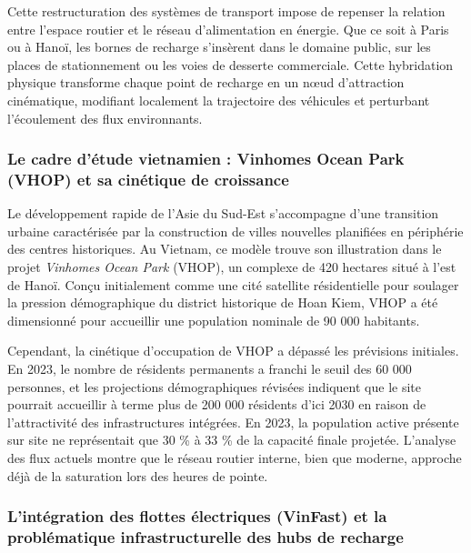\documentclass[10pt, a4paper]{article}
\begin{document}
Cette restructuration des systèmes de transport impose de repenser la
relation entre l'espace routier et le réseau d'alimentation en énergie.
Que ce soit à Paris ou à Hanoï, les bornes de recharge s'insèrent dans
le domaine public, sur les places de stationnement ou les voies de
desserte commerciale. Cette hybridation physique transforme chaque point
de recharge en un nœud d'attraction cinématique, modifiant localement la
trajectoire des véhicules et perturbant l'écoulement des flux
environnants.

\subsubsection{Le cadre d'étude vietnamien : Vinhomes Ocean Park (VHOP)
et sa cinétique de
croissance}\label{le-cadre-duxe9tude-vietnamien-vinhomes-ocean-park-vhop-et-sa-cinuxe9tique-de-croissance}

Le développement rapide de l'Asie du Sud-Est s'accompagne d'une
transition urbaine caractérisée par la construction de villes nouvelles
planifiées en périphérie des centres historiques. Au Vietnam, ce modèle
trouve son illustration dans le projet \emph{Vinhomes Ocean Park}
(VHOP), un complexe de 420 hectares situé à l'est de Hanoï. Conçu
initialement comme une cité satellite résidentielle pour soulager la
pression démographique du district historique de Hoan Kiem, VHOP a été
dimensionné pour accueillir une population nominale de 90 000 habitants.

Cependant, la cinétique d'occupation de VHOP a dépassé les prévisions
initiales. En 2023, le nombre de résidents permanents a franchi le seuil
des 60 000 personnes, et les projections démographiques révisées
indiquent que le site pourrait accueillir à terme plus de 200 000
résidents d'ici 2030 en raison de l'attractivité des infrastructures
intégrées. En 2023, la population active présente sur site ne
représentait que 30 \% à 33 \% de la capacité finale projetée. L'analyse
des flux actuels montre que le réseau routier interne, bien que moderne,
approche déjà de la saturation lors des heures de pointe.

\subsubsection{L'intégration des flottes électriques (VinFast) et la
problématique infrastructurelle des hubs de
recharge}\label{lintuxe9gration-des-flottes-uxe9lectriques-vinfast-et-la-probluxe9matique-infrastructurelle-des-hubs-de-recharge}
\end{document}
